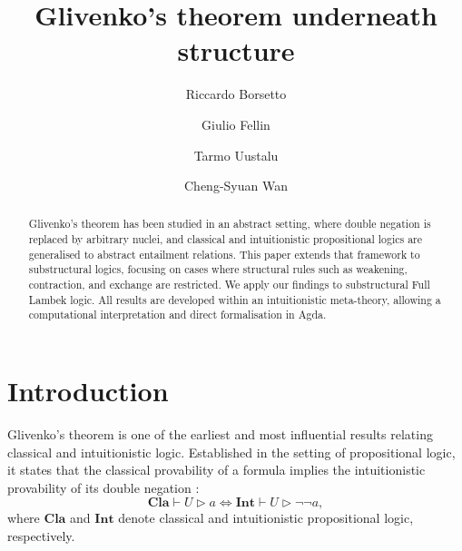 \documentclass[runningheads]{llncs}
\newcommand{\Cl}{\mathbf{Cla}}
\newcommand{\Int}{\mathbf{Int}}
\begin{document}
%
\title{Glivenko's theorem underneath structure}
%
%
\author{
    Riccardo Borsetto \and
    Giulio Fellin \and
    Tarmo Uustalu \and
    Cheng-Syuan Wan}
%
%
%
\maketitle              %
%
\begin{abstract}
    Glivenko's theorem has been studied in an abstract setting, where double negation is replaced by arbitrary nuclei, and classical and intuitionistic propositional logics are generalised to abstract entailment relations. This paper extends that framework to substructural logics, focusing on cases where structural rules such as weakening, contraction, and exchange are restricted. We apply our findings to substructural Full Lambek logic. All results are developed within an intuitionistic meta-theory, allowing a computational interpretation and direct formalisation in Agda.
    
\end{abstract}
%
%
%
\section{Introduction}

Glivenko's theorem is one of the earliest and most influential results relating classical and intuitionistic logic. Established in the setting of propositional logic, it states that the classical provability of a formula implies the intuitionistic provability of its double negation \cite{gliv28,gliv29}:
\[
\Cl \vdash U \rhd a \iff \Int \vdash U \rhd \neg\neg a,
\]
where $\Cl$ and $\Int$ denote classical and intuitionistic propositional logic, respectively.
\end{document}
